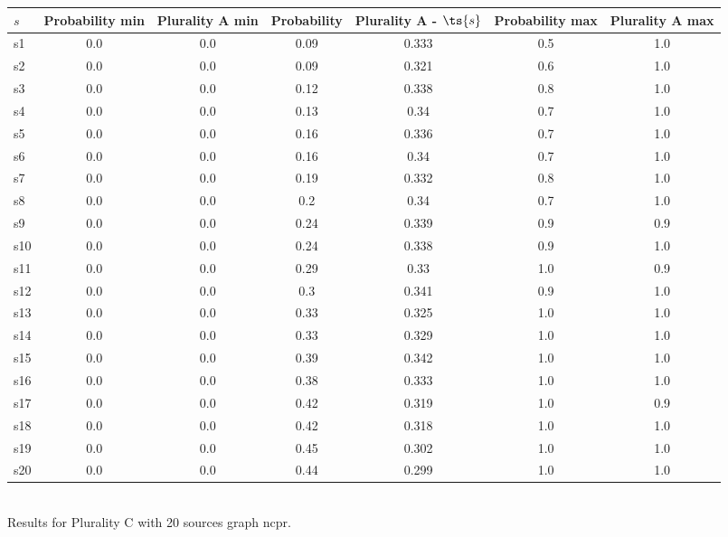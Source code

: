 \documentclass{article}
\begin{document}
\noindent\begin{tabular}{|l|c|c|c|c|c|c|}
\hline
$s$& Probability min & Plurality A min & Probability & Plurality A - $\ts{s}$ & Probability max & Plurality A max\\
\hline
s1 &0.0 & 0.0 & 0.09 & 0.333 & 0.5 & 1.0\\
\hline
s2 &0.0 & 0.0 & 0.09 & 0.321 & 0.6 & 1.0\\
\hline
s3 &0.0 & 0.0 & 0.12 & 0.338 & 0.8 & 1.0\\
\hline
s4 &0.0 & 0.0 & 0.13 & 0.34 & 0.7 & 1.0\\
\hline
s5 &0.0 & 0.0 & 0.16 & 0.336 & 0.7 & 1.0\\
\hline
s6 &0.0 & 0.0 & 0.16 & 0.34 & 0.7 & 1.0\\
\hline
s7 &0.0 & 0.0 & 0.19 & 0.332 & 0.8 & 1.0\\
\hline
s8 &0.0 & 0.0 & 0.2 & 0.34 & 0.7 & 1.0\\
\hline
s9 &0.0 & 0.0 & 0.24 & 0.339 & 0.9 & 0.9\\
\hline
s10 &0.0 & 0.0 & 0.24 & 0.338 & 0.9 & 1.0\\
\hline
s11 &0.0 & 0.0 & 0.29 & 0.33 & 1.0 & 0.9\\
\hline
s12 &0.0 & 0.0 & 0.3 & 0.341 & 0.9 & 1.0\\
\hline
s13 &0.0 & 0.0 & 0.33 & 0.325 & 1.0 & 1.0\\
\hline
s14 &0.0 & 0.0 & 0.33 & 0.329 & 1.0 & 1.0\\
\hline
s15 &0.0 & 0.0 & 0.39 & 0.342 & 1.0 & 1.0\\
\hline
s16 &0.0 & 0.0 & 0.38 & 0.333 & 1.0 & 1.0\\
\hline
s17 &0.0 & 0.0 & 0.42 & 0.319 & 1.0 & 0.9\\
\hline
s18 &0.0 & 0.0 & 0.42 & 0.318 & 1.0 & 1.0\\
\hline
s19 &0.0 & 0.0 & 0.45 & 0.302 & 1.0 & 1.0\\
\hline
s20 &0.0 & 0.0 & 0.44 & 0.299 & 1.0 & 1.0\\
\hline
\end{tabular}\\

\noindent Results for Plurality C with 20 sources graph ncpr.
\end{document}
